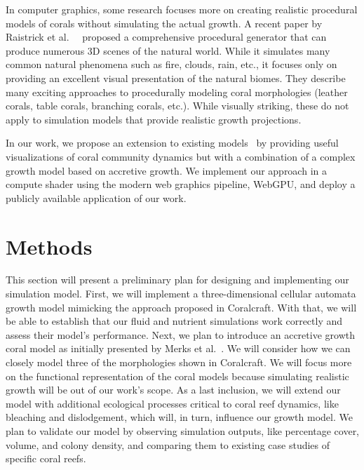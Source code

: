 \documentclass[9pt]{pnas-new}
\renewcommand{\etal}{et al.\ }
\newcommand{\etc}{etc.}
\begin{document}
In computer graphics, some research focuses more on creating realistic procedural models of corals without simulating the actual growth. A recent paper by Raistrick \etal ~\cite{inifinigen} proposed a comprehensive procedural generator that can produce numerous 3D scenes of the natural world. While it simulates many common natural phenomena such as fire, clouds, rain, \etc, it focuses only on providing an excellent visual presentation of the natural biomes. They describe many exciting approaches to procedurally modeling coral morphologies (leather corals, table corals, branching corals, \etc). While visually striking, these do not apply to simulation models that provide realistic growth projections.

In our work, we propose an extension to existing models~\cite{coral_community_3D, coral_community_main} by providing useful visualizations of coral community dynamics but with a combination of a complex growth model based on accretive growth. We implement our approach in a compute shader using the modern web graphics pipeline, WebGPU, and deploy a publicly available application of our work.

\section*{Methods}

This section will present a preliminary plan for designing and implementing our simulation model. First, we will implement a three-dimensional cellular automata growth model mimicking the approach proposed in Coralcraft. With that, we will be able to establish that our fluid and nutrient simulations work correctly and assess their model's performance. Next, we plan to introduce an accretive growth coral model as initially presented by Merks \etal. We will consider how we can closely model three of the morphologies shown in Coralcraft. We will focus more on the functional representation of the coral models because simulating realistic growth will be out of our work's scope. As a last inclusion, we will extend our model with additional ecological processes critical to coral reef dynamics, like bleaching and dislodgement, which will, in turn, influence our growth model. We plan to validate our model by observing simulation outputs, like percentage cover, volume, and colony density, and comparing them to existing case studies of specific coral reefs.
\end{document}
